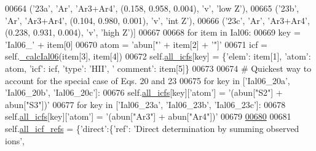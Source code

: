 \begin{DoxyCode}
00664                  (\textcolor{stringliteral}{'23a'}, \textcolor{stringliteral}{'Ar'}, \textcolor{stringliteral}{'Ar3+Ar4'}, (0.158, 0.958, 0.004), \textcolor{stringliteral}{'v'}, \textcolor{stringliteral}{'low Z'}),
00665                  (\textcolor{stringliteral}{'23b'}, \textcolor{stringliteral}{'Ar'}, \textcolor{stringliteral}{'Ar3+Ar4'}, (0.104, 0.980, 0.001), \textcolor{stringliteral}{'v'}, \textcolor{stringliteral}{'int Z'}),
00666                  (\textcolor{stringliteral}{'23c'}, \textcolor{stringliteral}{'Ar'}, \textcolor{stringliteral}{'Ar3+Ar4'}, (0.238, 0.931, 0.004), \textcolor{stringliteral}{'v'}, \textcolor{stringliteral}{'high Z'})]
00667         
00668         \textcolor{keywordflow}{for} item \textcolor{keywordflow}{in} Ial06:
00669             key = \textcolor{stringliteral}{'Ial06\_'} + item[0]
00670             atom = \textcolor{stringliteral}{'abun["'} + item[2] + \textcolor{stringliteral}{'"]'}
00671             icf = self.\hyperlink{classpyneb_1_1core_1_1icf_1_1_i_c_f_ad5be47170b8a6f32e86d88499dba4803}{\_calcIal06}(item[3], item[4])
00672             self.\hyperlink{classpyneb_1_1core_1_1icf_1_1_i_c_f_a854ee87a53feb102e429e902227ce88b}{all\_icfs}[key] = \{\textcolor{stringliteral}{'elem'}: item[1], \textcolor{stringliteral}{'atom'}: atom, \textcolor{stringliteral}{'icf'}: icf, \textcolor{stringliteral}{'type'}: \textcolor{stringliteral}{'HII'}, \textcolor{stringliteral}{'
      comment'}: item[5]\}
00673 
00674         \textcolor{comment}{# Quickest way to account for the special case of Eqs. 20 and 23}
00675         \textcolor{keywordflow}{for} key \textcolor{keywordflow}{in} [\textcolor{stringliteral}{'Ial06\_20a'}, \textcolor{stringliteral}{'Ial06\_20b'}, \textcolor{stringliteral}{'Ial06\_20c'}]:
00676             self.\hyperlink{classpyneb_1_1core_1_1icf_1_1_i_c_f_a854ee87a53feb102e429e902227ce88b}{all\_icfs}[key][\textcolor{stringliteral}{'atom'}] = \textcolor{stringliteral}{'(abun["S2"] + abun["S3"])'}
00677         \textcolor{keywordflow}{for} key \textcolor{keywordflow}{in} [\textcolor{stringliteral}{'Ial06\_23a'}, \textcolor{stringliteral}{'Ial06\_23b'}, \textcolor{stringliteral}{'Ial06\_23c'}]:
00678             self.\hyperlink{classpyneb_1_1core_1_1icf_1_1_i_c_f_a854ee87a53feb102e429e902227ce88b}{all\_icfs}[key][\textcolor{stringliteral}{'atom'}] = \textcolor{stringliteral}{'(abun["Ar3"] + abun["Ar4"])'}
00679         
\hypertarget{classpyneb_1_1core_1_1icf_1_1_i_c_f_l00680}{}\hyperlink{classpyneb_1_1core_1_1icf_1_1_i_c_f_a9777abc7cc843cd5c4d8c5810c1b2ed1}{00680} 
00681         self.\hyperlink{classpyneb_1_1core_1_1icf_1_1_i_c_f_a9777abc7cc843cd5c4d8c5810c1b2ed1}{all\_icf\_refs} = \{\textcolor{stringliteral}{'direct'}:\{\textcolor{stringliteral}{'ref'}: \textcolor{stringliteral}{'Direct determination by summing observed ions'},

\end{DoxyCode}
